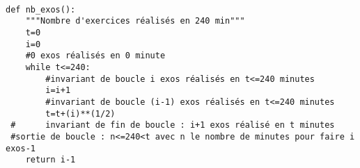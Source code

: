 \exer{}
\setcounter{numques}{0}

\question{} 
\begin{lstlisting}

def nb_exos():
    """Nombre d'exercices réalisés en 240 min"""
    t=0
    i=0
    #0 exos réalisés en 0 minute
    while t<=240:
        #invariant de boucle i exos réalisés en t<=240 minutes
        i=i+1
        #invariant de boucle (i-1) exos réalisés en t<=240 minutes
        t=t+(i)**(1/2)
 #      invariant de fin de boucle : i+1 exos réalisé en t minutes
 #sortie de boucle : n<=240<t avec n le nombre de minutes pour faire i exos-1
    return i-1
\end{lstlisting}

